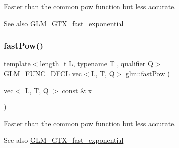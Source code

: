 Faster than the common pow function but less accurate. \begin{DoxySeeAlso}{See also}
\mbox{\hyperlink{group__gtx__fast__exponential}{G\+L\+M\+\_\+\+G\+T\+X\+\_\+fast\+\_\+exponential}} 
\end{DoxySeeAlso}
\mbox{\label{group__gtx__fast__exponential_ga1abe488c0829da5b9de70ac64aeaa7e5}} 
\subsubsection{\texorpdfstring{fast\+Pow()}{fastPow()}\hspace{0.1cm}{\footnotesize\ttfamily [4/4]}}
{\footnotesize\ttfamily template$<$length\+\_\+t L, typename T , qualifier Q$>$ \\
\mbox{\hyperlink{setup_8hpp_ab2d052de21a70539923e9bcbf6e83a51}{G\+L\+M\+\_\+\+F\+U\+N\+C\+\_\+\+D\+E\+CL}} \mbox{\hyperlink{structglm_1_1vec}{vec}}$<$L, T, Q$>$ glm\+::fast\+Pow (\begin{DoxyParamCaption}\item[{\mbox{\hyperlink{structglm_1_1vec}{vec}}$<$ L, T, Q $>$ const \&}]{x }\end{DoxyParamCaption})}

Faster than the common pow function but less accurate. \begin{DoxySeeAlso}{See also}
\mbox{\hyperlink{group__gtx__fast__exponential}{G\+L\+M\+\_\+\+G\+T\+X\+\_\+fast\+\_\+exponential}} 
\end{DoxySeeAlso}
